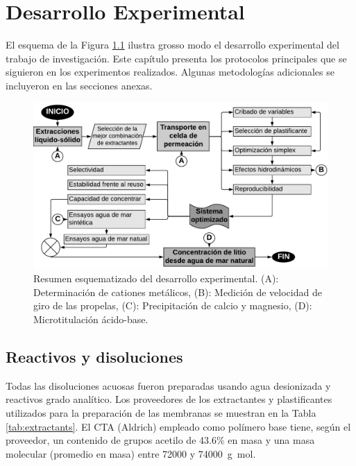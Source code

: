 \chapter{Desarrollo Experimental}
\vspace{-1\baselineskip}El esquema de la Figura \ref{fig:expresumen} ilustra grosso modo el desarrollo experimental del trabajo de investigación. Este capítulo presenta los protocolos principales que se siguieron en los experimentos realizados. Algunas metodologías adicionales se incluyeron en las secciones anexas.\enlargethispage{3\baselineskip}
{
\begin{figure}[H]
    \includegraphics[width=\textwidth]{chap3/summary.pdf}
    \caption[Resumen esquematizado del desarrollo experimental.]{Resumen esquematizado del desarrollo experimental. (A): Determinación de cationes metálicos, (B): Medición de velocidad de giro de las propelas, (C): Precipitación de calcio y magnesio, (D): Microtitulación ácido-base.}
    \label{fig:expresumen}
\end{figure}
}
\clearpage\section{Reactivos y disoluciones}
Todas las disoluciones acuosas fueron preparadas usando agua desionizada y reactivos grado analítico. Los proveedores de los extractantes y plastificantes utilizados para la preparación de las membranas se muestran en la Tabla \ref{tab:extractants}. El \ac{CTA} (Aldrich) empleado como polímero base tiene, según el proveedor, un contenido de grupos acetilo de 43.6\% en masa y una masa molecular (promedio en masa) entre 72000 y 74000~g~mol\mnn. 


